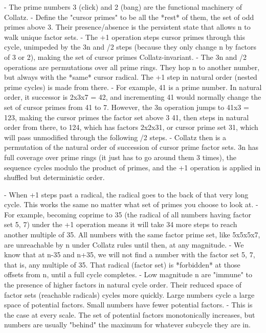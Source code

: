 \documentclass[12pt]{article}
\theoremstyle{plain}
\theoremstyle{definition}
\begin{document}
- The prime numbers 3 (click) and 2 (bang) are the functional machinery of Collatz. 
- Define the "cursor primes" to be all the *rest* of them, the set of odd primes above 3. Their presence/absence is the persistent state that allows n to walk unique factor sets.
- The +1 operation steps cursor primes through this cycle, unimpeded by the 3n and /2 steps (because they only change n by factors of 3 or 2), making the set of cursor primes Collatz-invariant.
- The 3n and /2 operations are permutations over all prime rings. They hop n to another number, but always with the *same* cursor radical. The +1 step in natural order (nested prime cycles) is made from there. 
- For example, 41 is a prime number. In natural order, it successor is 2x3x7 = 42, and incrementing 41 would normally change the set of cursor primes from {41} to {7}. However, the 3n operation jumps to 41x3 = 123, making the cursor primes the factor set above 3 {41}, then steps in natural order from there, to 124, which has factors 2x2x31, or cursor prime set {31}, which will pass unmodified through the following /2 steps. 
- Collatz then is a permutation of the natural order of succession of cursor prime factor sets. 3n has full coverage over prime rings (it just has to go around them 3 times), the sequence cycles modulo the product of primes, and the +1 operation is applied in shuffled but deterministic order.




- When +1 steps past a radical, the radical goes to the back of that very long cycle. This works the same no matter what set of primes you choose to look at.
- For example, becoming coprime to 35 (the radical of all numbers having factor set {5, 7}) under the +1 operation means it will take 34 more steps to reach another multiple of 35. All numbers with the same factor prime set, like 5x5x5x7, are unreachable by n under Collatz rules until then, at any magnitude.
- We know that at n-35 and n+35, we will not find a number with the factor set {5, 7}, that is, any multiple of 35. That radical (factor set) is *forbidden* at those offsets from n, until a full cycle completes.
- Low magnitude n are "immune" to the presence of higher factors in natural cycle order. Their reduced space of factor sets (reachable radicals) cycles more quickly. Large numbers cycle a large space of potential factors. Small numbers have fewer potential factors. 
- This is the case at every scale. The set of potential factors monotonically increases, but numbers are usually "behind" the maximum for whatever subcycle they are in.
\end{document}
